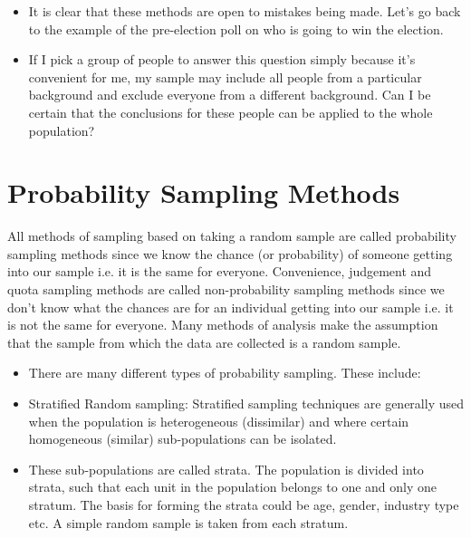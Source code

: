 ﻿\documentclass[]{report}
\begin{document}

\begin{itemize}
\item It is clear that these methods are open to mistakes being made. Let’s go back to the example of the pre-election poll on who is going to win the election. 
\item If I pick a group of people to answer this question simply because it’s convenient for me, my sample may include all people from a particular background and exclude everyone from a different background. Can I be certain that the conclusions for these people can be applied to the whole population? 

\end{itemize}


\newpage
\section*{Probability Sampling Methods}

All methods of sampling based on taking a random sample are called probability sampling methods since we know the chance (or probability) of someone getting into our sample i.e. it is the same for everyone. Convenience, judgement and quota sampling methods are called non-probability sampling methods since we don’t know what the chances are for an individual getting into our sample i.e. it is not the same for everyone. Many methods of analysis make the assumption that the sample from which the data are collected is a random sample. 


\begin{itemize}
\item There are many different types of probability sampling. These include:

\item Stratified Random sampling: Stratified sampling techniques are generally used when the population is heterogeneous (dissimilar) and where certain homogeneous (similar) sub-populations can be isolated. 

\item These sub-populations are called strata. The population is divided into strata, such that each unit in the population belongs to one and only one stratum. The basis for forming the strata could be age, gender, industry type etc.  A simple random sample is taken from each stratum. 
\end{itemize}
\end{document}
